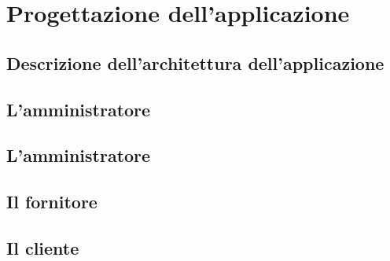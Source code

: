 \documentclass{article}
\begin{document}
% 


% 

% 



\section{Progettazione dell'applicazione}
\subsection{Descrizione dell'architettura dell'applicazione}
 

\subsection{L'amministratore}


\subsection{L'amministratore}


\subsection{Il fornitore}


\subsection{Il cliente}

\end{document}
